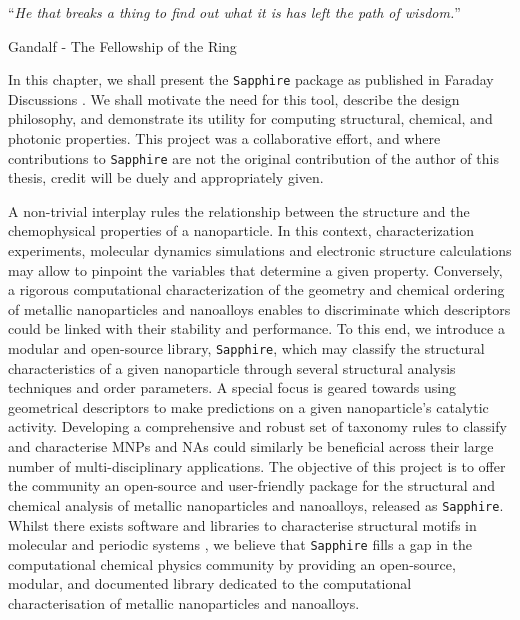 
\noindent\enquote{\itshape He that breaks a thing to find out what it is has left the path of wisdom.}\bigbreak

\hfill Gandalf - The Fellowship of the Ring

\vspace*{0.05\textheight}

In this chapter, we shall present the \texttt{Sapphire} package as published in Faraday Discussions \cite{Sapphy}. We shall motivate the need for this tool, describe the design philosophy, and demonstrate its utility for computing structural, chemical, and photonic properties. This project was a collaborative effort, and where contributions to \texttt{Sapphire} are not the original contribution of the author of this thesis, credit will be duely and appropriately given.

A non-trivial interplay rules the relationship between the structure and the chemophysical properties of a nanoparticle.
In this context, characterization experiments, molecular dynamics simulations and electronic structure calculations may allow to pinpoint the variables that determine a given property.
Conversely, a rigorous computational characterization of the geometry and chemical ordering of metallic nanoparticles and nanoalloys enables to discriminate which descriptors could be linked with their stability and performance.
To this end, we introduce a modular and open-source library, \texttt{Sapphire}, which may  classify the structural characteristics of a given nanoparticle through several structural analysis techniques and order parameters.
A special focus is geared towards using geometrical descriptors to make predictions on a given nanoparticle's catalytic activity.
%
Developing a comprehensive and robust set of taxonomy rules to classify and characterise MNPs and NAs could similarly be beneficial across their large number of multi-disciplinary applications.
%
The objective of this project is to offer the community an open-source and user-friendly package for the structural and chemical analysis of metallic nanoparticles and nanoalloys, released as \texttt{Sapphire}.
%
Whilst there exists software and libraries to characterise structural motifs in molecular and periodic systems \cite{freud2020,oliver_beckstein-proc-scipy-2016,https://doi.org/10.1002/jcc.21787}, we believe that \texttt{Sapphire} fills a gap in the computational chemical physics community by providing an open-source, modular, and documented library dedicated to the computational characterisation of metallic nanoparticles and nanoalloys.

